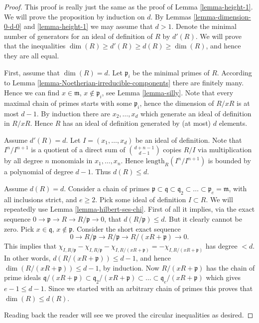 \begin{proof}
This proof is really just the same as the proof of Lemma
\ref{lemma-height-1}. We will prove the proposition by induction
on $d$. By Lemmas \ref{lemma-dimension-0-d-0} and \ref{lemma-height-1}
we may assume that $d > 1$. Denote the minimal number of
generators for an ideal of definition of $R$ by $d'(R)$.
We will prove that the inequalities
$\dim(R) \geq d'(R) \geq d(R) \geq \dim(R)$,
and hence they are all equal.

\medskip\noindent
First, assume that $\dim(R) = d$.
Let $\mathfrak p_i$ be the minimal primes of $R$.
According to Lemma \ref{lemma-Noetherian-irreducible-components}
there are finitely many. Hence we can find $x \in \mathfrak m$,
$x \not \in \mathfrak p_i$, see Lemma \ref{lemma-silly}.
Note that every maximal chain of primes starts with some $\mathfrak p_i$,
hence the dimension of $R/xR$ is at most $d-1$. By induction
there are $x_2,\ldots, x_d$ which generate an ideal of definition
in $R/xR$. Hence $R$ has an ideal of definition generated
by (at most) $d$ elements.

\medskip\noindent
Assume $d'(R) = d$. Let $I = (x_1,\ldots,x_d)$ be an ideal
of definition. Note that $I^n/I^{n+1}$ is a quotient of a direct
sum of ${d + n - 1 \choose d - 1}$ copies $R/I$ via multiplication
by all degree $n$ monomials in $x_1,\ldots,x_n$.
Hence $\text{length}_R(I^n/I^{n+1})$ is bounded by a polynomial
of degree $d-1$. Thus $d(R) \leq d$.

\medskip\noindent
Assume $d(R) = d$. Consider a chain of primes
$\mathfrak p \subset \mathfrak q \subset 
\mathfrak q_2 \subset \ldots \subset \mathfrak p_e = \mathfrak m$,
with all inclusions strict, and $e \geq 2$.
Pick some ideal of definition $I \subset R$.
We will repeatedly use
Lemma \ref{lemma-hilbert-ses-chi}. First of all
it implies, via the exact sequence
$0 \to \mathfrak p \to R \to R/\mathfrak p \to 0$,
that $d(R/\mathfrak p) \leq d$. But it clearly cannot
be zero. Pick $x\in \mathfrak q$, $x\not \in \mathfrak p$.
Consider the short exact sequence
$$
0 \to R/\mathfrak p \to R/\mathfrak p \to R/(xR + \mathfrak p) \to 0.
$$
This implies that $\chi_{I,R/\mathfrak p} - \chi_{I,R/\mathfrak p}
- \chi_{I, R/(xR + \mathfrak p)} = - \chi_{I, R/(xR + \mathfrak p)}$
has degree $ < d$. In other words, $d(R/(xR + \mathfrak p)) \leq d - 1$,
and hence $\dim(R/(xR + \mathfrak p)) \leq d - 1$, by
induction. Now $R/(xR + \mathfrak p)$ has the chain of prime ideals
$\mathfrak q/(xR + \mathfrak p) \subset \mathfrak q_2/(xR + \mathfrak p)
\subset \ldots \subset \mathfrak q_e/(xR + \mathfrak p)$ which gives
$e - 1 \leq d - 1$. Since we started with an arbitrary chain of
primes this proves that $\dim(R) \leq d(R)$.

\medskip\noindent
Reading back the reader will see we proved the circular 
inequalities as desired.
\end{proof}

